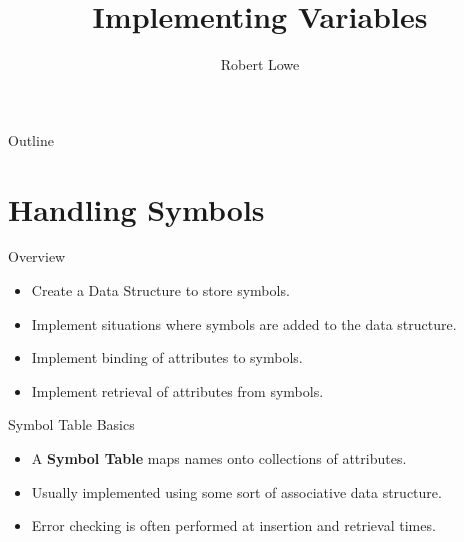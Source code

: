 \documentclass[handout]{beamer}
\title{Implementing Variables}
\author{Robert Lowe}
\institute[Southeast Missouri State University] %
{
  Department of Computer Science\\
  Southeast Missouri State University
}
\date[]{}
\begin{document}
\begin{frame}
  \titlepage
\end{frame}

\begin{frame}{Outline}
  \tableofcontents
\end{frame}




\section{Handling Symbols}

\begin{frame}{Overview}
    \begin{itemize}
        \item Create a Data Structure to store symbols.
        \item Implement situations where symbols are added to the data structure.
        \item Implement binding of attributes to symbols.
        \item Implement retrieval of attributes from symbols.
    \end{itemize}
\end{frame}

\begin{frame}{Symbol Table Basics}
    \begin{itemize}
        \item A \textbf{Symbol Table} maps names onto collections of attributes.
        \item Usually implemented using some sort of associative data structure.
        \item Error checking is often performed at insertion and retrieval times.
    \end{itemize}
\end{frame}
\end{document}
